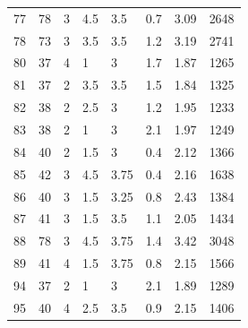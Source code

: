 \begin{table}[h!]
\begin{tabular*}{\linewidth}{p{45pt}<{\centering}p{25pt}<{\centering}
p{35pt}<{\centering}p{45pt}<{\centering}p{35pt}<{\centering}p{66pt}<{\centering}
p{66pt}<{\centering}p{40pt}<{\centering}}
77 & 78 & 3 & 4.5 & 3.5 & 0.7 & 3.09 & 2648 \\
78 & 73 & 3 & 3.5 & 3.5 & 1.2 & 3.19 & 2741 \\
80 & 37 & 4 & 1 & 3 & 1.7 & 1.87 & 1265 \\
81 & 37 & 2 & 3.5 & 3.5 & 1.5 & 1.84 & 1325 \\
82 & 38 & 2 & 2.5 & 3 & 1.2 & 1.95 & 1233 \\
83 & 38 & 2 & 1 & 3 & 2.1 & 1.97 & 1249 \\
84 & 40 & 2 & 1.5 & 3 & 0.4 & 2.12 & 1366 \\
85 & 42 & 3 & 4.5 & 3.75 & 0.4 & 2.16 & 1638 \\
86 & 40 & 3 & 1.5 & 3.25 & 0.8 & 2.43 & 1384 \\
87 & 41 & 3 & 1.5 & 3.5 & 1.1 & 2.05 & 1434 \\
88 & 78 & 3 & 4.5 & 3.75 & 1.4 & 3.42 & 3048 \\
89 & 41 & 4 & 1.5 & 3.75 & 0.8 & 2.15 & 1566 \\ 
94 & 37 & 2 & 1 & 3 & 2.1 & 1.89 & 1289 \\
95 & 40 & 4 & 2.5 & 3.5 & 0.9 & 2.15 & 1406 \\
\bottomrule
  \end{tabular*}
  \label{Ap2}
\end{table}

 

